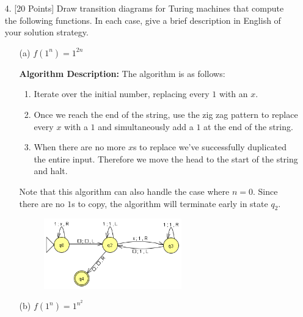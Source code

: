 \documentclass[12pt]{article}
\begin{document}
\begin{spacing}{1.5}
\begin{enumerate}
\begin{enumerate}
                  \end{enumerate}

                  \newpage
            \item[4.] [20 Points] Draw transition diagrams for Turing machines that compute the following functions. In each case, give a brief description in English of your solution strategy.

                  \begin{enumerate}
                        \item[(a)] $f(1^n) = 1^{2n}$

                              \textbf{Algorithm Description:}
                              The algorithm is as follows:
                              \begin{enumerate}
                                    \item Iterate over the initial number, replacing every $1$ with an $x$.
                                    \item Once we reach the end of the string, use the zig zag pattern to replace every $x$ with a $1$ and simultaneously add a $1$ at the end of the string.
                                    \item When there are no more $x$s to replace we've successfully duplicated the entire input. Therefore we move the head to the start of the string and halt.
                              \end{enumerate}

                              Note that this algorithm can also handle the case where $n=0$. Since there are no $1$s to copy, the algorithm will terminate early in state $q_2$.

                              \begin{figure}[h!]
                                    \centering
                                    \includegraphics[width=0.6\textwidth]{img/q4/q4a.png}
                              \end{figure}

                              \newpage
                        \item[(b)] $f(1^n) = 1^{n^2}$


\end{enumerate}
\end{enumerate}
\end{spacing}
\end{document}
